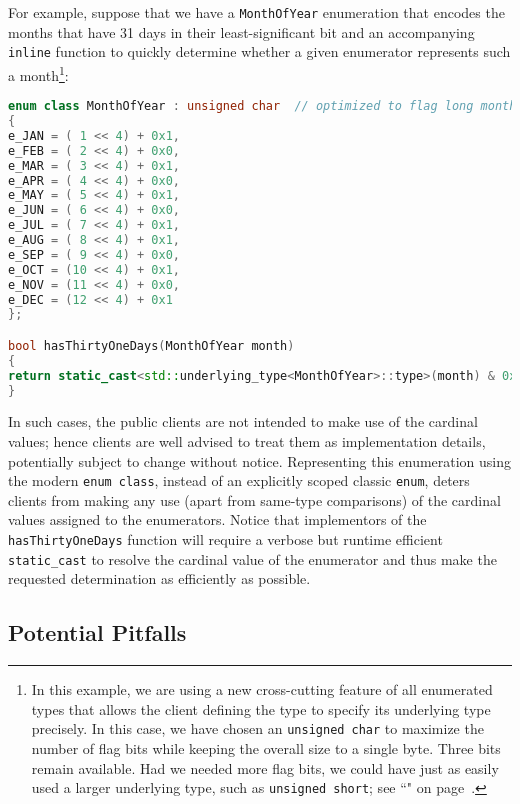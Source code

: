 For example, suppose that we have a \texttt{MonthOfYear} enumeration
that encodes the months that have 31 days in their least-significant bit
and an accompanying \texttt{inline} function to quickly determine
whether a given enumerator represents such a month{\cprotect\footnote{In this example, we are using a new cross-cutting
feature of all enumerated types that allows the client defining the
type to specify its underlying type precisely. In this case, we have
chosen an \texttt{unsigned}~\texttt{char} to maximize the number of
flag bits while keeping the overall size to a single byte. Three bits
remain available. Had we needed more flag bits, we could have just as
easily used a larger underlying type, such as
\texttt{unsigned}~\texttt{short}; see ``" on page~\pageref{explicit-enumeration-underlying-type}.}}:

\begin{lstlisting}[language=C++]
enum class MonthOfYear : unsigned char  // optimized to flag long months
{
e_JAN = ( 1 << 4) + 0x1,
e_FEB = ( 2 << 4) + 0x0,
e_MAR = ( 3 << 4) + 0x1,
e_APR = ( 4 << 4) + 0x0,
e_MAY = ( 5 << 4) + 0x1,
e_JUN = ( 6 << 4) + 0x0,
e_JUL = ( 7 << 4) + 0x1,
e_AUG = ( 8 << 4) + 0x1,
e_SEP = ( 9 << 4) + 0x0,
e_OCT = (10 << 4) + 0x1,
e_NOV = (11 << 4) + 0x0,
e_DEC = (12 << 4) + 0x1
};

bool hasThirtyOneDays(MonthOfYear month)
{
return static_cast<std::underlying_type<MonthOfYear>::type>(month) & 0x1;
}
\end{lstlisting}

\noindent In such cases, the public clients are not intended to make use of the
cardinal values; hence clients are well advised to treat them as
implementation details, potentially subject to change without notice.
Representing this enumeration using the modern
\texttt{enum}~\texttt{class}, instead of an explicitly scoped classic
\texttt{enum}, deters clients from making any use (apart from same-type
comparisons) of the cardinal values assigned to the enumerators. Notice
that implementors of the \texttt{hasThirtyOneDays} function will require
a verbose but runtime efficient \texttt{static\_cast} to resolve the
cardinal value of the enumerator and thus make the requested
determination as efficiently as possible.

\subsection[Potential Pitfalls]{Potential Pitfalls}\label{potential-pitfalls-enumclass}

